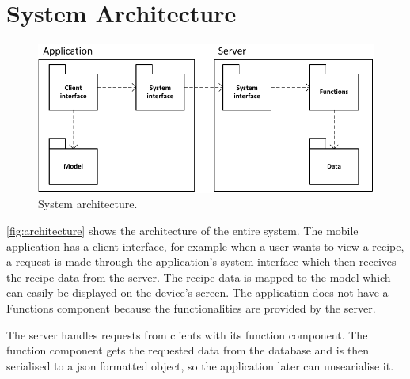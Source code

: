 \section{System Architecture}

\begin{figure}[H]
\centering
\includegraphics[width=0.9\linewidth]{img/components.pdf}
\caption{System architecture.}
\label{fig:architecture}
\end{figure}

\autoref{fig:architecture} shows the architecture of the entire system. The mobile application has a client interface, for example when a user wants to view a recipe, a request is made through the application's system interface which then receives the recipe data from the server. The recipe data is mapped to the model which can easily be displayed on the device's screen. The application does not have a Functions component because the functionalities are provided by the server.

The server handles requests from clients with its function component. The function component gets the requested data from the database and is then serialised to a \ac{json} formatted object, so the application later can unsearialise it.